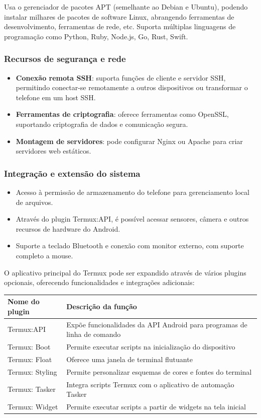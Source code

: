 Usa o gerenciador de pacotes APT (semelhante ao Debian e Ubuntu), podendo instalar milhares de pacotes de software Linux, abrangendo ferramentas de desenvolvimento, ferramentas de rede, etc. Suporta múltiplas linguagens de programação como Python, Ruby, Node.js, Go, Rust, Swift.

\subsubsection*{Recursos de segurança e rede}

\begin{itemize}
  \item \textbf{Conexão remota SSH}: suporta funções de cliente e servidor SSH, permitindo conectar-se remotamente a outros dispositivos ou transformar o telefone em um host SSH.
  \item \textbf{Ferramentas de criptografia}: oferece ferramentas como OpenSSL, suportando criptografia de dados e comunicação segura.
  \item \textbf{Montagem de servidores}: pode configurar Nginx ou Apache para criar servidores web estáticos.
\end{itemize}

\subsubsection*{Integração e extensão do sistema}

\begin{itemize}
  \item Acesso à permissão de armazenamento do telefone para gerenciamento local de arquivos.
  \item Através do plugin Termux:API, é possível acessar sensores, câmera e outros recursos de hardware do Android.
  \item Suporte a teclado Bluetooth e conexão com monitor externo, com suporte completo a mouse.
\end{itemize}


O aplicativo principal do Termux pode ser expandido através de vários plugins opcionais, oferecendo funcionalidades e integrações adicionais:

\begin{center}
\begin{tabularx}{\linewidth}{|X|X|}
\hline
\textbf{Nome do plugin} & \textbf{Descrição da função} \tabularnewline
\hline
Termux:API & Expõe funcionalidades da API Android para programas de linha de comando \tabularnewline
Termux: Boot & Permite executar scripts na inicialização do dispositivo \tabularnewline
Termux: Float & Oferece uma janela de terminal flutuante \tabularnewline
Termux: Styling & Permite personalizar esquemas de cores e fontes do terminal \tabularnewline
Termux: Tasker & Integra scripts Termux com o aplicativo de automação Tasker \tabularnewline
Termux: Widget & Permite executar scripts a partir de widgets na tela inicial \tabularnewline
\hline
\end{tabularx}
\end{center}

